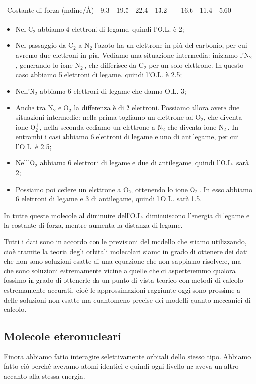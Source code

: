 \begin{center}
\begin{tabular}{ m{3cm}m{1cm}m{1cm}m{1cm}m{1cm}|m{1cm}m{1cm}m{1cm}m{1cm}m{1cm}}
        \vspace{0.2cm}Costante di forza (mdine/Å) & 9.3 & 19.5 & 22.4 & 13.2 & & 16.6 & 11.4 & 5.60
    \end{tabular}
\end{center}

\begin{itemize}
    \item Nel C$_2$ abbiamo 4 elettroni di legame, quindi l'O.L. è 2;
    \item Nel passaggio da C$_2$ a N$_2$ l'azoto ha un elettrone in più del carbonio, per cui avremo due elettroni in più. Vediamo una situazione intermedia: iniziamo l'N$_2$, generando lo ione N$_2^+$, che differisce da C$_2$ per un solo elettrone. In questo caso abbiamo 5 elettroni di legame, quindi l'O.L. è 2.5;
    \item Nell'N$_2$ abbiamo 6 elettroni di legame che danno O.L. 3;
    \item Anche tra N$_2$ e O$_2$ la differenza è di 2 elettroni. Possiamo allora avere due situazioni intermedie: nella prima togliamo un elettrone ad O$_2$, che diventa ione O$_2^+$, nella seconda cediamo un elettrone a N$_2$ che diventa ione N$_2^-$. In entrambi i casi abbiamo 6 elettroni di legame e uno di antilegame, per cui l'O.L. è 2.5;
    \item Nell'O$_2$ abbiamo 6 elettroni di legame e due di antilegame, quindi l'O.L. sarà 2;
    \item Possiamo poi cedere un elettrone a O$_2$, ottenendo lo ione O$_2^-$. In esso abbiamo 6 elettroni di legame e 3 di antilegame, quindi l'O.L. sarà 1.5.
\end{itemize}

In tutte queste molecole al diminuire dell'O.L. diminuiscono l'energia di legame e la costante di forza, mentre aumenta la distanza di legame.

Tutti i dati sono in accordo con le previsioni del modello che stiamo utilizzando, cioè tramite la teoria degli orbitali molecolari siamo in grado di ottenere dei dati che non sono soluzioni esatte di una equazione che non sappiamo risolvere, ma che sono soluzioni estremamente vicine a quelle che ci aspetteremmo qualora fossimo in grado di ottenerle da un punto di vista teorico con metodi di calcolo estremamente accurati, cioè le approssimazioni raggiunte oggi sono prossime a delle soluzioni non esatte ma quantomeno precise dei modelli quanto-meccanici di calcolo.

\subsection{Molecole eteronucleari}
Finora abbiamo fatto interagire selettivamente orbitali dello stesso tipo. Abbiamo fatto ciò perché avevamo atomi identici e quindi ogni livello ne aveva un altro accanto alla stessa energia.

